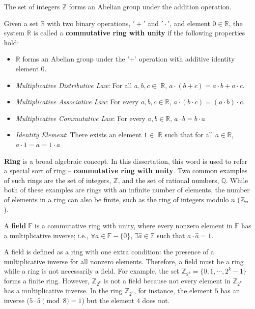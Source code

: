 The set of integers $\mathbb{Z}$ forms an Abelian group under the addition operation. 

\begin{Definition}
Given a set $\mathbb{R}$ with two binary operations, $'+'$ and $'\cdot'$, 
and element $0 \in \mathbb{R}$, the system $\mathbb{R}$ is called a {\bf commutative ring with unity} if the following properties hold:
\begin{itemize}
\item $\mathbb{R}$ forms an Abelian group under the '+' operation with additive identity element $0$.
\item {\it Multiplicative Distributive Law}: For all $a, b, c \in$ $\mathbb{R}$, $a\cdot (b + c) = a\cdot b + a\cdot c$.
\item {\it Multiplicative Associative Law}: For every $a, b, c\in \mathbb{R}$, $a\cdot (b\cdot c) = (a\cdot b)\cdot c$. 
\item {\it Multiplicative Commutative Law}: For every $a,b \in \mathbb{R}$, $a\cdot b = b\cdot a$
\item {\it Identity Element}: There exists an element $1 \in$ $\mathbb{R}$ 
such that for all $a \in \mathbb{R}$, $a\cdot 1 = a =1\cdot a$
\end{itemize}
\end{Definition}

{\bf Ring} is a broad algebraic concept. In this dissertation, this word is used to refer a special 
sort of ring -- {\bf commutative ring with unity}. Two common 
examples of such rings are the set of integers, $\mathbb{Z}$, and the set of 
rational numbers, $\mathbb{Q}$. While both of these examples are
rings with an infinite number of elements, the number of elements in a ring 
can also be finite, such as the ring of integers modulo $n$ (${\mathbb{Z}}_n$).

\begin{Definition}
A {\bf field} $\mathbb{F}$ is a commutative ring with unity, where every
nonzero element in $\mathbb{F}$ has a multiplicative inverse; i.e., $\forall
a \in \mathbb{F} - \{0\}$, $\exists \hat{a} \in \mathbb{F}$ such that $ a \cdot
\hat{a} = 1$.
\end{Definition}

A field is defined as a ring with one extra condition: the presence of a 
multiplicative inverse for all nonzero elements.
Therefore, a field must be a ring while a ring is not necessarily a field.
For example, the set $\mathbb{Z}_{2^k} = \{0,1,\cdots, 2^k-1\}$ forms a finite ring.
However, $\mathbb{Z}_{2^k}$ is not a field because not every element in
$\mathbb{Z}_{2^k}$ has a multiplicative inverse. 
In the ring $\mathbb{Z}_{2^3}$, for 
instance, the element $5$ has an inverse ($5\cdot5\pmod{8}=1$) but the element $4$
does not.

